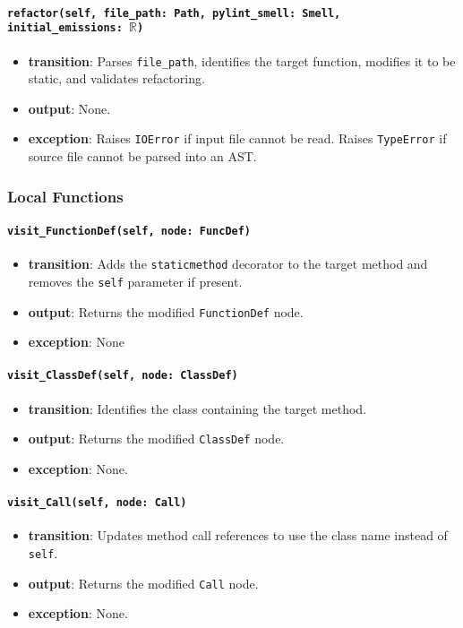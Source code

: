 \documentclass[12pt, titlepage]{article}
\begin{document}
\paragraph{\texttt{refactor(self, file\_path: Path, pylint\_smell: Smell, initial\_emissions: $\mathbb{R}$)}}
\begin{itemize}
  \item \textbf{transition}: Parses \texttt{file\_path}, identifies the target function, modifies it to be static, and validates refactoring.
  \item \textbf{output}: None.
  \item \textbf{exception}: Raises \texttt{IOError} if input file cannot be read. Raises \texttt{TypeError} if source file cannot be parsed into an AST.
\end{itemize}

\subsubsection{Local Functions}
\paragraph{\texttt{visit\_FunctionDef(self, node: FuncDef)}}
\begin{itemize}
  \item \textbf{transition}: Adds the \texttt{staticmethod} decorator to the target method and removes the \texttt{self} parameter if present.
  \item \textbf{output}: Returns the modified \texttt{FunctionDef} node.
  \item \textbf{exception}: None
\end{itemize}

\paragraph{\texttt{visit\_ClassDef(self, node: ClassDef)}}
\begin{itemize}
  \item \textbf{transition}: Identifies the class containing the target method.
  \item \textbf{output}: Returns the modified \texttt{ClassDef} node.
  \item \textbf{exception}: None.
\end{itemize}

\paragraph{\texttt{visit\_Call(self, node: Call)}}
\begin{itemize}
  \item \textbf{transition}: Updates method call references to use the class name instead of \texttt{self}.
  \item \textbf{output}: Returns the modified \texttt{Call} node.
  \item \textbf{exception}: None.
\end{itemize}
  
\end{document}
